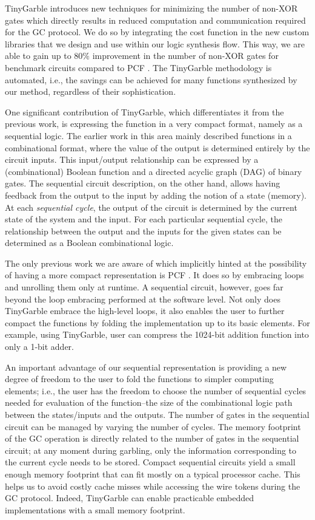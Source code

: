 TinyGarble introduces new techniques for minimizing the number of non-XOR gates which directly results in reduced computation and communication required for the GC protocol.
We do so by integrating the cost function in the new custom libraries that we design and use within our logic synthesis flow.
This way, we are able to gain up to $80\%$ improvement in the number of non-XOR gates for benchmark circuits compared to PCF \cite{kreuter2013pcf}.
The TinyGarble methodology is automated, i.e., the savings can be achieved for many functions synthesized by our method, regardless of their sophistication.

One significant contribution of TinyGarble, which differentiates it from the previous work, is expressing the function in a very compact format, namely as a sequential logic.
The earlier work in this area mainly described functions in a combinational format, where the value of the output is determined entirely by the circuit inputs.
This input/output relationship can be expressed by a (combinational) Boolean function and a directed acyclic graph (DAG) of binary gates.
The sequential circuit description, on the other hand, allows having feedback from the output to the input by adding the notion of a state (memory).
At each \emph{sequential cycle}, the output of the circuit is determined by the current state of the system and the input.
For each particular sequential cycle, the relationship between the output and the inputs for the given states can be determined as a Boolean combinational logic.

The only previous work we are aware of which implicitly hinted at the possibility of having a more compact representation is PCF \cite{kreuter2013pcf}.
It does so by embracing loops and unrolling them only at runtime.
A sequential circuit, however, goes far beyond the loop embracing performed at the software level.
Not only does TinyGarble embrace the high-level loops, it also enables the user to further compact the functions by folding the implementation up to its basic elements.
For example, using TinyGarble, user can compress the 1024-bit addition function into only a 1-bit adder.

An important advantage of our sequential representation is providing a new degree of freedom to the user to fold the functions to simpler computing elements; i.e., the user has the freedom to choose the number of sequential cycles needed for evaluation of the function--the size of the combinational logic path between the states/inputs and the outputs.
The number of gates in the sequential circuit can be managed by varying the number of cycles.
The memory footprint of the GC operation is directly related to the number of gates in the sequential circuit; at any moment during garbling, only the information corresponding to the current cycle needs to be stored.
Compact sequential circuits yield a small enough memory footprint that can fit mostly on a typical processor cache.
This helps us to avoid costly cache misses while accessing the wire tokens during the GC protocol.
Indeed, TinyGarble can enable practicable embedded implementations with a small memory footprint.

